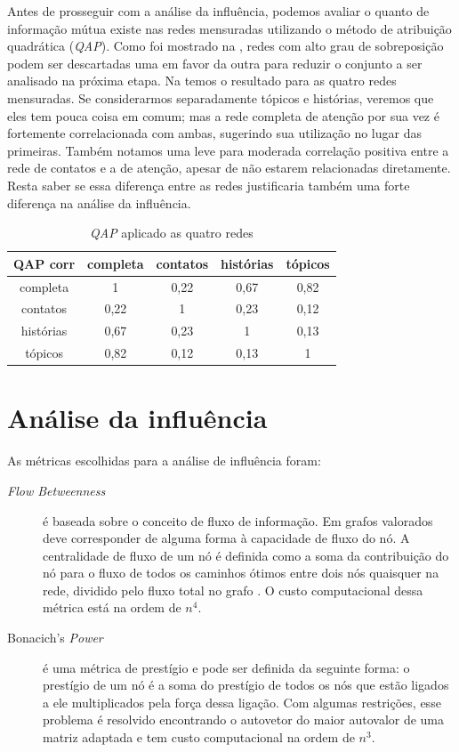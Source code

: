 Antes de prosseguir com a análise da influência, podemos avaliar o quanto de
informação mútua existe nas redes mensuradas utilizando o método de atribuição
quadrática (\emph{QAP}). Como foi mostrado na , redes com
alto grau de sobreposição podem ser descartadas uma em favor da outra para
reduzir o conjunto a ser analisado na próxima etapa. Na  temos
o resultado para as quatro redes mensuradas. Se considerarmos separadamente
tópicos e histórias, veremos que eles tem pouca coisa em comum; mas a rede
completa de atenção por sua vez é fortemente correlacionada com ambas, sugerindo
sua utilização no lugar das primeiras. Também notamos uma leve para moderada
correlação positiva entre a rede de contatos e a de atenção, apesar de não
estarem relacionadas diretamente. Resta saber se essa diferença entre as redes
justificaria também uma forte diferença na análise da influência.

\begin{table}[htbp]
	\setlength{\arrayrulewidth}{2\arrayrulewidth}
	\setlength{\belowcaptionskip}{10pt}
	\caption{\emph{QAP} aplicado as quatro redes} \centering
	\begin{tabular}{|c | c  c  c  c |}
	\hline
	QAP corr & completa & contatos & histórias & tópicos \\ \hline
	completa & 1 & 0,22 & 0,67 & 0,82 \\
	contatos & 0,22 & 1 & 0,23 & 0,12 \\
	histórias & 0,67 & 0,23 & 1 & 0,13 \\
	tópicos	& 0,82 & 0,12 & 0,13 & 1 \\ \hline
	\end{tabular}
	\label{ap:tab:qap}
\end{table}


\section{Análise da influência}
\label{ap:sec:analise}

As métricas escolhidas para a análise de influência foram:
\begin{description}
\item[\emph{Flow Betweenness}] é baseada sobre o conceito de fluxo de
informação. Em grafos valorados deve corresponder de alguma forma à capacidade
de fluxo do nó. A centralidade de fluxo de um nó é definida como a soma da
contribuição do nó para o fluxo de todos os caminhos ótimos entre dois nós
quaisquer na rede, dividido pelo fluxo total no grafo \citep{Freeman1991}. O
custo computacional dessa métrica está na ordem de $n^4$.
\item[Bonacich's \emph{Power}] é uma métrica de prestígio e pode ser definida da
seguinte forma: o prestígio de um nó é a soma do prestígio de todos os nós que
estão ligados a ele multiplicados pela força dessa ligação. Com algumas
restrições, esse problema é resolvido encontrando o autovetor do maior autovalor
de uma matriz adaptada e tem custo computacional na ordem de $n^3$.
\end{description}

